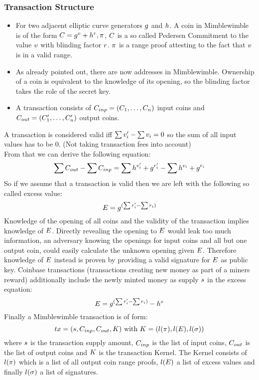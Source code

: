 \subsubsection{Transaction Structure}
\begin{itemize}
    \item For two adjacent elliptic curve generators $g$ and $h$. A coin in Mimblewimble is of the form $C = g^{v} + h^{r}, \pi$, $C$ is a so called Pedersen Commitment
    to the value $v$ with blinding factor $r$. $\pi$ is a range proof attesting to the fact that $v$ is in a valid range.
    \item As already pointed out, there are now addresses in Mimblewimble. Ownership of a coin is equivalent to the knowledge of its opening, so the blinding factor takes the role of the secret key.
    \item A transaction consists of $C_{inp} = (C_1, \dots, C_n)$ input coins and $C_{out} = (C'_1, \dots, C'_n)$ output coins.
\end{itemize}
A transaction is considered valid iff $\sum{v'_i} - \sum{v_i} = 0$ so the sum of all input values has to be 0. (Not taking transaction fees into account)\\
From that we can derive the following equation:
\[ \sum{C_{out}} - \sum{C_{inp}} = \sum{h^{v'_i} + g^{r'_i}} - \sum{h^{v_i} + g^{r_i}} \]
So if we assume that a transaction is valid then we are left with the following so called excess value:
\[ E = g^{(\sum{r'_i} - \sum{r_i})} \]
Knowledge of the opening of all coins and the validity of the transaction implies knowledge of $E$.
Directly revealing the opening to $E$ would leak too much information, an adversary knowing the openings for input coins and all but one output coin, could easily calculate the unknown opening given $E$.
Therefore knowledge of $E$ instead is proven by providing a valid signature for $E$ as public key.
Coinbase transactions (transactions creating new money as part of a miners reward) additionally include the newly minted money as supply $s$ in the excess equation:
\[ E = g^{(\sum{r'_i} - \sum{r_i})} - h^{s} \]
Finally a Mimblewimble transaction is of form:
\[ tx = (s, C_{inp}, C_{out}, K)~\text{with}~K = (l(\pi), l(E), l(\sigma)) \]
where $s$ is the transaction supply amount, $C_{inp}$ is the list of input coins, $C_{out}$ is the list of output coins and $K$ is the transaction Kernel. The Kernel consists of $l(\pi)$
which is a list of all output coin range proofs, $l(E)$ a list of excess values and finally $l(\sigma)$ a list of signatures.


